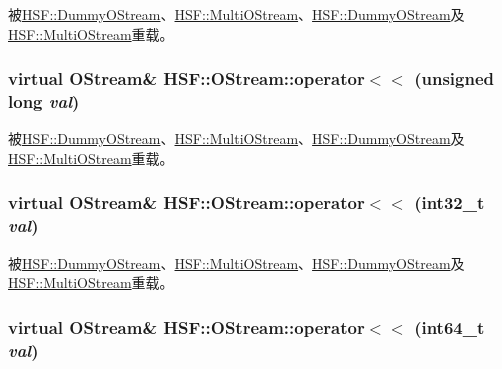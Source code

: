 被\hyperlink{classHSF_1_1DummyOStream_a9a138ca0d1ea4ebc7b3d699391bb3635}{HSF::DummyOStream}、\hyperlink{classHSF_1_1MultiOStream_a62badc16d7c2ac1ec092032698202938}{HSF::MultiOStream}、\hyperlink{classHSF_1_1DummyOStream_a9a138ca0d1ea4ebc7b3d699391bb3635}{HSF::DummyOStream}及\hyperlink{classHSF_1_1MultiOStream_a62badc16d7c2ac1ec092032698202938}{HSF::MultiOStream}重载。\hypertarget{classHSF_1_1OStream_ae4edb4f375ace6dab22021629c29a24f}{
\subsubsection[{operator$<$$<$}]{\setlength{\rightskip}{0pt plus 5cm}virtual {\bf OStream}\& HSF::OStream::operator$<$$<$ (unsigned long {\em val})}}
\label{classHSF_1_1OStream_ae4edb4f375ace6dab22021629c29a24f}


被\hyperlink{classHSF_1_1DummyOStream_a7c3f9f5c2e3a05760819499df1aa6592}{HSF::DummyOStream}、\hyperlink{classHSF_1_1MultiOStream_a40a0605bc99045578fccf9c5413411f5}{HSF::MultiOStream}、\hyperlink{classHSF_1_1DummyOStream_a7c3f9f5c2e3a05760819499df1aa6592}{HSF::DummyOStream}及\hyperlink{classHSF_1_1MultiOStream_a40a0605bc99045578fccf9c5413411f5}{HSF::MultiOStream}重载。\hypertarget{classHSF_1_1OStream_a1bbf47f6f3c68938fb4c1006b878aa60}{
\subsubsection[{operator$<$$<$}]{\setlength{\rightskip}{0pt plus 5cm}virtual {\bf OStream}\& HSF::OStream::operator$<$$<$ (int32\_\-t {\em val})}}
\label{classHSF_1_1OStream_a1bbf47f6f3c68938fb4c1006b878aa60}


被\hyperlink{classHSF_1_1DummyOStream_a58e20bb47f254b73898d940bb496ee1f}{HSF::DummyOStream}、\hyperlink{classHSF_1_1MultiOStream_a83208fee91d9117cf7411cd63477c9fe}{HSF::MultiOStream}、\hyperlink{classHSF_1_1DummyOStream_a58e20bb47f254b73898d940bb496ee1f}{HSF::DummyOStream}及\hyperlink{classHSF_1_1MultiOStream_a83208fee91d9117cf7411cd63477c9fe}{HSF::MultiOStream}重载。\hypertarget{classHSF_1_1OStream_a771b87dab59786db30cf1d5eb5473e64}{
\subsubsection[{operator$<$$<$}]{\setlength{\rightskip}{0pt plus 5cm}virtual {\bf OStream}\& HSF::OStream::operator$<$$<$ (int64\_\-t {\em val})}}
\label{classHSF_1_1OStream_a771b87dab59786db30cf1d5eb5473e64}


